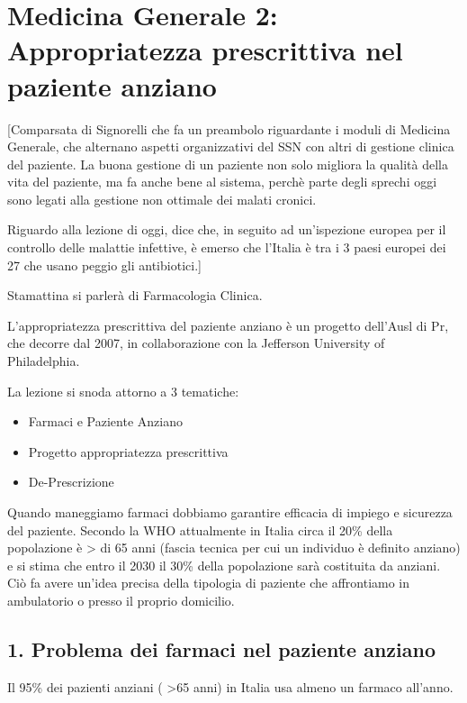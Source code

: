 \section{Medicina Generale 2: Appropriatezza prescrittiva nel paziente anziano}

{[}Comparsata di Signorelli che fa un preambolo riguardante i moduli di
Medicina Generale, che alternano aspetti organizzativi del SSN con altri
di gestione clinica del paziente. La buona gestione di un paziente non
solo migliora la qualità della vita del paziente, ma fa anche bene al
sistema, perchè parte degli sprechi oggi sono legati alla gestione non
ottimale dei malati cronici.

Riguardo alla lezione di oggi, dice che, in seguito ad un'ispezione
europea per il controllo delle malattie infettive, è emerso che l'Italia
è tra i 3 paesi europei dei 27 che usano peggio gli antibiotici.{]}

Stamattina si parlerà di Farmacologia Clinica.

L'appropriatezza prescrittiva del paziente anziano è un progetto
dell'Ausl di Pr, che decorre dal 2007, in collaborazione con la
Jefferson University of Philadelphia.

La lezione si snoda attorno a 3 tematiche:

\begin{itemize}
\item
  Farmaci e Paziente Anziano
\item
  Progetto appropriatezza prescrittiva
\item
  De-Prescrizione
\end{itemize}

  Quando maneggiamo farmaci dobbiamo garantire efficacia di impiego e
  sicurezza del paziente. Secondo la WHO attualmente in Italia circa il
  20\% della popolazione è \textgreater{} di 65 anni (fascia tecnica per
  cui un individuo è definito anziano) e si stima che entro il 2030 il
  30\% della popolazione sarà costituita da anziani. Ciò fa avere
  un'idea precisa della tipologia di paziente che affrontiamo in
  ambulatorio o presso il proprio domicilio.

  \subsection{1. Problema dei farmaci nel paziente anziano}

  Il 95\% dei pazienti anziani ( \textgreater{}65 anni) in Italia usa
  almeno un farmaco all'anno.

